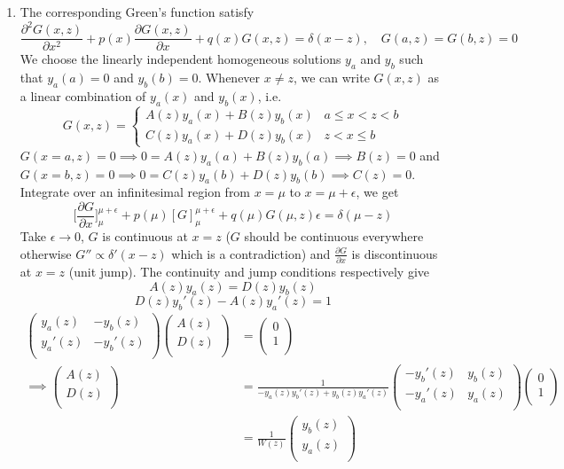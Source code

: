 \documentclass[a4paper]{article}
\begin{document}
\begin{ans}\leavevmode
\begin{enumerate}[label=(\alph*)]
\item  The corresponding Green's function satisfy
$$\frac{\partial^2G(x,z)}{\partial x^2}+p(x)\frac{\partial G(x,z)}{\partial x}+q(x)G(x,z)=\delta(x-z),\quad G(a,z)=G(b,z)=0$$
We choose the linearly independent homogeneous solutions $y_a$ and $y_b$ such that $y_a(a)=0$ and $y_b(b)=0$. Whenever $x\neq z$, we can write $G(x,z)$ as a linear combination of $y_a(x)$ and $y_b(x)$, i.e.
$$G(x,z)=
\left\{
        \begin{array}{ll}
      A(z)y_a(x)+B(z)y_b(x) & a\leq x<z<b \\
      C(z)y_a(x)+D(z)y_b(x) & z<x\leq b
        \end{array}
    \right.$$
$G(x=a,z)=0\implies 0=A(z)y_a(a)+B(z)y_b(a)\implies B(z)=0$ and $G(x=b,z)=0\implies 0=C(z)y_a(b)+D(z)y_b(b)\implies C(z)=0$. Integrate over an infinitesimal region from $x=\mu$ to $x=\mu+\epsilon$, we get
$$\bigg[\frac{\partial G}{\partial x}\bigg]_\mu^{\mu+\epsilon}+p(\mu)[G]_{\mu}^{\mu+\epsilon}+q(\mu)G(\mu,z)\epsilon=\delta(\mu-z)$$
Take $\epsilon\rightarrow 0$, $G$ is continuous at $x=z$ ($G$ should be continuous everywhere otherwise $G''\propto\delta'(x-z)$ which is a contradiction) and $\frac{\partial G}{\partial x}$ is discontinuous at $x=z$ (unit jump). The continuity and jump conditions respectively give 
$$A(z)y_a(z)=D(z)y_b(z)$$ 
$$D(z)y_b'(z)-A(z)y_a'(z)=1$$
\begin{align}
\begin{pmatrix}y_a(z)&-y_b(z)\\y_a'(z)&-y_b'(z)\\\end{pmatrix}\begin{pmatrix}A(z)\\D(z)\\\end{pmatrix}&=\begin{pmatrix}0\\1\\\end{pmatrix}\nonumber\\\implies\begin{pmatrix}A(z)\\D(z)\\\end{pmatrix}&=\frac{1}{-y_a(z)y_b'(z)+y_b(z)y_a'(z)}\begin{pmatrix}-y_b'(z)&y_b(z)\\-y_a'(z)&y_a(z)\\\end{pmatrix}\begin{pmatrix}0\\1\\\end{pmatrix}\nonumber\\&=\frac{1}{W(z)}\begin{pmatrix}y_b(z)\\y_a(z)\\\end{pmatrix}\nonumber

\end{align}
\end{enumerate}
\end{ans}
\end{document}
